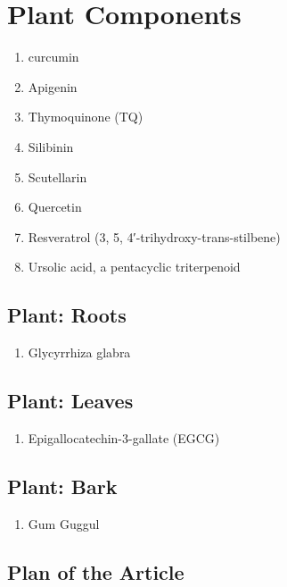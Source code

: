 \section{Plant Components}

\begin{enumerate}
\item curcumin
\item Apigenin
\item Thymoquinone (TQ)
\item Silibinin
\item Scutellarin 
\item Quercetin
\item Resveratrol (3, 5, 4′-trihydroxy-trans-stilbene)
\item Ursolic acid, a pentacyclic triterpenoid
\end{enumerate}

\subsection{Plant: Roots}

\begin{enumerate}
\item Glycyrrhiza glabra
\end{enumerate}


\subsection{Plant: Leaves}

\begin{enumerate}
\item Epigallocatechin-3-gallate (EGCG)
\end{enumerate}


\subsection{Plant: Bark}

\begin{enumerate}
\item Gum Guggul
\end{enumerate}


\subsection{Plan of the Article}

\begin{enumerate}
\end{enumerate}




